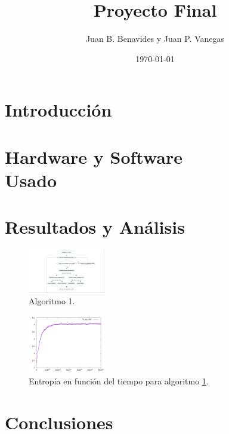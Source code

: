 \documentclass[12pt,twocolumn]{article}
\title{Proyecto Final}
\author{Juan B. Benavides y Juan P. Vanegas }
\date{\today}
\begin{document}
\maketitle

\section{\label{sec: Intro} Introducción}

\section{Hardware y Software \\ Usado}

\section{Resultados y Análisis}
\begin{figure}
    \centering
    \includegraphics[width=0.3\textwidth]{figs/Algoritmo_OOP.png}
    \caption{Algoritmo 1.}
    \label{fig:algoritmo_OOP}
\end{figure}

\begin{figure}
    \centering
    \includegraphics[width=0.3\textwidth]{figs/S_vs_t_OOP_all.png}
    \caption{Entropía en función del tiempo para algoritmo \ref{fig:algoritmo_OOP}.}
    \label{fig:s_vs_t}
\end{figure}


\section{Conclusiones}
\end{document}
